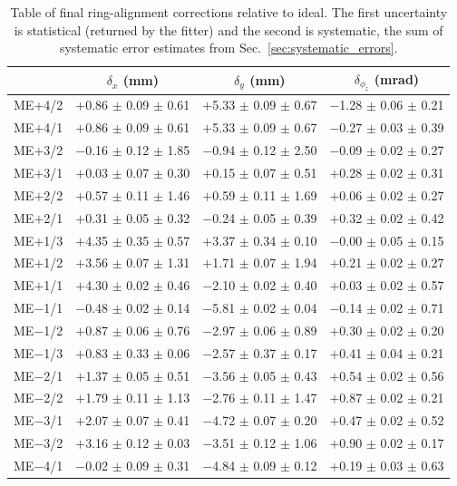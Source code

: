 \documentclass[12pt]{article}
\begin{document}
\begin{table}
\caption{Table of final ring-alignment corrections relative to
  ideal.  The first uncertainty is statistical (returned by the
  fitter) and the second is systematic, the sum of systematic error
  estimates from Sec.~\ref{sec:systematic_errors}. \label{tab:results}}
\begin{center}
\renewcommand{\arraystretch}{1.2}
\begin{tabular}{l c c c}
& $\delta_x$ (mm) & $\delta_y$ (mm) & $\delta_{\phi_z}$ (mrad) \\\hline
ME$+$4/2 & $+$0.86 $\pm$ 0.09 $\pm$ 0.61 & $+$5.33 $\pm$ 0.09 $\pm$ 0.67 & $-$1.28 $\pm$ 0.06 $\pm$ 0.21 \\
ME$+$4/1 & $+$0.86 $\pm$ 0.09 $\pm$ 0.61 & $+$5.33 $\pm$ 0.09 $\pm$ 0.67 & $-$0.27 $\pm$ 0.03 $\pm$ 0.39 \\
ME$+$3/2 & $-$0.16 $\pm$ 0.12 $\pm$ 1.85 & $-$0.94 $\pm$ 0.12 $\pm$ 2.50 & $-$0.09 $\pm$ 0.02 $\pm$ 0.27 \\
ME$+$3/1 & $+$0.03 $\pm$ 0.07 $\pm$ 0.30 & $+$0.15 $\pm$ 0.07 $\pm$ 0.51 & $+$0.28 $\pm$ 0.02 $\pm$ 0.31 \\
ME$+$2/2 & $+$0.57 $\pm$ 0.11 $\pm$ 1.46 & $+$0.59 $\pm$ 0.11 $\pm$ 1.69 & $+$0.06 $\pm$ 0.02 $\pm$ 0.27 \\
ME$+$2/1 & $+$0.31 $\pm$ 0.05 $\pm$ 0.32 & $-$0.24 $\pm$ 0.05 $\pm$ 0.39 & $+$0.32 $\pm$ 0.02 $\pm$ 0.42 \\
ME$+$1/3 & $+$4.35 $\pm$ 0.35 $\pm$ 0.57 & $+$3.37 $\pm$ 0.34 $\pm$ 0.10 & $-$0.00 $\pm$ 0.05 $\pm$ 0.15 \\
ME$+$1/2 & $+$3.56 $\pm$ 0.07 $\pm$ 1.31 & $+$1.71 $\pm$ 0.07 $\pm$ 1.94 & $+$0.21 $\pm$ 0.02 $\pm$ 0.27 \\
ME$+$1/1 & $+$4.30 $\pm$ 0.02 $\pm$ 0.46 & $-$2.10 $\pm$ 0.02 $\pm$ 0.40 & $+$0.03 $\pm$ 0.02 $\pm$ 0.57 \\\hline
ME$-$1/1 & $-$0.48 $\pm$ 0.02 $\pm$ 0.14 & $-$5.81 $\pm$ 0.02 $\pm$ 0.04 & $-$0.14 $\pm$ 0.02 $\pm$ 0.71 \\
ME$-$1/2 & $+$0.87 $\pm$ 0.06 $\pm$ 0.76 & $-$2.97 $\pm$ 0.06 $\pm$ 0.89 & $+$0.30 $\pm$ 0.02 $\pm$ 0.20 \\
ME$-$1/3 & $+$0.83 $\pm$ 0.33 $\pm$ 0.06 & $-$2.57 $\pm$ 0.37 $\pm$ 0.17 & $+$0.41 $\pm$ 0.04 $\pm$ 0.21 \\
ME$-$2/1 & $+$1.37 $\pm$ 0.05 $\pm$ 0.51 & $-$3.56 $\pm$ 0.05 $\pm$ 0.43 & $+$0.54 $\pm$ 0.02 $\pm$ 0.56 \\
ME$-$2/2 & $+$1.79 $\pm$ 0.11 $\pm$ 1.13 & $-$2.76 $\pm$ 0.11 $\pm$ 1.47 & $+$0.87 $\pm$ 0.02 $\pm$ 0.21 \\
ME$-$3/1 & $+$2.07 $\pm$ 0.07 $\pm$ 0.41 & $-$4.72 $\pm$ 0.07 $\pm$ 0.20 & $+$0.47 $\pm$ 0.02 $\pm$ 0.52 \\
ME$-$3/2 & $+$3.16 $\pm$ 0.12 $\pm$ 0.03 & $-$3.51 $\pm$ 0.12 $\pm$ 1.06 & $+$0.90 $\pm$ 0.02 $\pm$ 0.17 \\
ME$-$4/1 & $-$0.02 $\pm$ 0.09 $\pm$ 0.31 & $-$4.84 $\pm$ 0.09 $\pm$ 0.12 & $+$0.19 $\pm$ 0.03 $\pm$ 0.63 \\\hline
\end{tabular}
\end{center}
\end{table}
\end{document}
